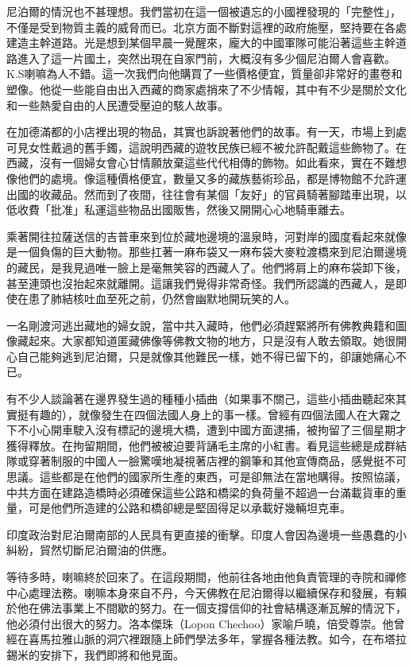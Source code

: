尼泊爾的情況也不甚理想。我們當初在這一個被遺忘的小國裡發現的「完整性」，不僅是受到物質主義的威脅而已。北京方面不斷對這裡的政府施壓，堅持要在各處建造主幹道路。光是想到某個早晨一覺醒來，龐大的中國軍隊可能沿著這些主幹道路進入了這一片國土，突然出現在自家門前，大概沒有多少個尼泊爾人會喜歡。K.S喇嘛為人不錯。這一次我們向他購買了一些價格便宜，質量卻非常好的畫卷和塑像。他從一些能自由出入西藏的商家處捎來了不少情報，其中有不少是關於文化和一些熱愛自由的人民遭受壓迫的駭人故事。

在加德滿都的小店裡出現的物品，其實也訴說著他們的故事。有一天，市場上到處可見女性戴過的舊手鐲，這說明西藏的遊牧民族已經不被允許配戴這些飾物了。在西藏，沒有一個婦女會心甘情願放棄這些代代相傳的飾物。如此看來，實在不難想像他們的處境。像這種價格便宜，數量又多的藏族藝術珍品，都是博物館不允許運出國的收藏品。然而到了夜間，往往會有某個「友好」的官員騎著腳踏車出現，以低收費「批准」私運這些物品出國販售，然後又開開心心地騎車離去。

乘著開往拉薩送信的吉普車來到位於藏地邊境的溫泉時，河對岸的國度看起來就像是一個負傷的巨大動物。那些扛著一麻布袋又一麻布袋大麥粒渡橋來到尼泊爾邊境的藏民，是我見過唯一臉上是毫無笑容的西藏人了。他們將肩上的麻布袋卸下後，甚至連頭也沒抬起來就離開。這讓我們覺得非常奇怪。我們所認識的西藏人，是即使在患了肺結核吐血至死之前，仍然會幽默地開玩笑的人。

一名剛渡河逃出藏地的婦女說，當中共入藏時，他們必須趕緊將所有佛教典籍和圖像藏起來。大家都知道匿藏佛像等佛教文物的地方，只是沒有人敢去領取。她很開心自己能夠逃到尼泊爾，只是就像其他難民一樣，她不得已留下的，卻讓她痛心不已。

有不少人談論著在邊界發生過的種種小插曲（如果事不關己，這些小插曲聽起來其實挺有趣的），就像發生在四個法國人身上的事一樣。曾經有四個法國人在大霧之下不小心開車駛入沒有標記的邊境大橋，遭到中國方面逮捕，被拘留了三個星期才獲得釋放。在拘留期間，他們被被迫要背誦毛主席的小紅書。看見這些總是成群結隊或穿著制服的中國人一臉驚嘆地凝視著店裡的鋼筆和其他宣傳商品，感覺挺不可思議。這些都是在他們的國家所生產的東西，可是卻無法在當地購得。按照協議，中共方面在建路造橋時必須確保這些公路和橋梁的負荷量不超過一台滿載貨車的重量，可是他們所造建的公路和橋卻總是堅固得足以承載好幾輛坦克車。

印度政治對尼泊爾南部的人民具有更直接的衝擊。印度人會因為邊境一些愚蠢的小糾紛，貿然切斷尼泊爾油的供應。

等待多時，喇嘛終於回來了。在這段期間，他前往各地由他負責管理的寺院和禪修中心處理法務。喇嘛本身來自不丹，今天佛教在尼泊爾得以繼續保存和發展，有賴於他在佛法事業上不間歇的努力。在一個支撐信仰的社會結構逐漸瓦解的情況下，他必須付出很大的努力。洛本傑珠（Lopon
Chechoo）家喻戶曉，倍受尊崇。他曾經在喜馬拉雅山脈的洞穴裡跟隨上師們學法多年，掌握各種法教。如今，在布塔拉錫米的安排下，我們即將和他見面。


